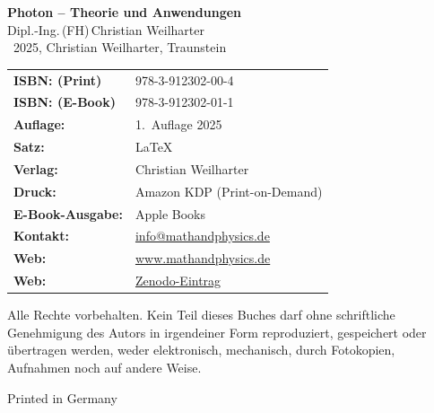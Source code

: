 
\thispagestyle{empty}
\pagestyle{fancy}
\fancyfoot[C]{\thepage}   %
\fancyfoot[L]{}
\fancyfoot[R]{}


\begin{center}


{\Large\textbf{Photon – Theorie und Anwendungen}}\\[1.2em]
{\large Dipl.-Ing.\,(FH)\,Christian Weilharter}\\[1.2em]
\textcopyright~2025, Christian Weilharter, Traunstein\\[2em]
\end{center}
\begin{flushleft}
	\begin{tabular}{@{}l l}
	
	
		\textbf{ISBN: (Print)} & 978-3-912302-00-4 \\[0.5em]
			\textbf{ISBN: (E-Book)} & 978-3-912302-01-1 \\[0.5em]
		\textbf{Auflage:} & 1.~Auflage 2025 \\[0.5em]
		\textbf{Satz:} & \LaTeX \\[0.5em]
		\textbf{Verlag:} & Christian Weilharter \\[0.5em]
		\textbf{Druck:} & Amazon KDP (Print-on-Demand) \\[0.5em]

			\textbf{E-Book-Ausgabe:} & Apple Books\\[0.5em]
		
		\textbf{Kontakt:} & \href{mailto:info@mathandphysics.de}{info@mathandphysics.de}\\[0.5em]
		\textbf{Web:} & \href{https://www.mathandphysics.de}{www.mathandphysics.de}\\

	
    \textbf{Web:} & \href{https://zenodo.org/records/17413001}{Zenodo-Eintrag}\\

	\end{tabular}
\end{flushleft}

\vspace{2em}
\noindent
Alle Rechte vorbehalten. Kein Teil dieses Buches darf ohne schriftliche Genehmigung des Autors 
in irgendeiner Form reproduziert, gespeichert oder übertragen werden, 
weder elektronisch, mechanisch, durch Fotokopien, Aufnahmen noch auf andere Weise.
\begin{center}\small Printed in Germany\end{center}

